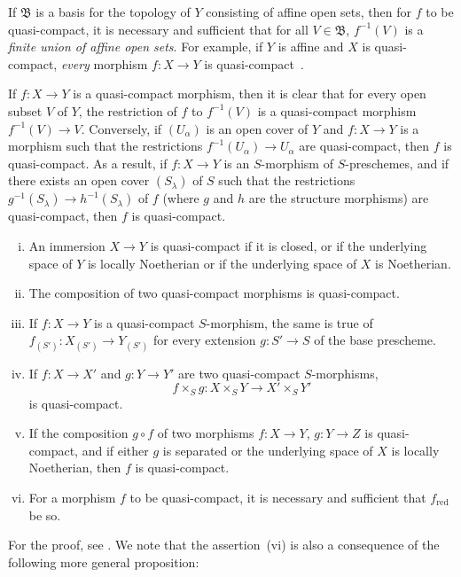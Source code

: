 If $\mathfrak{B}$ is a basis for the topology of $Y$ consisting of affine open sets, then for $f$ to be quasi-compact, it is necessary and sufficient that for all $V\in\mathfrak{B}$, $f^{-1}(V)$ is a \emph{finite union of affine open sets}.
For example, if $Y$ is affine and $X$ is quasi-compact, \emph{every} morphism $f:X\to Y$ is quasi-compact~.

If $f:X\to Y$ is a quasi-compact morphism, then it is clear that for every open subset $V$ of $Y$, the restriction of $f$ to $f^{-1}(V)$ is a quasi-compact morphism $f^{-1}(V)\to V$.
Conversely, if $(U_\alpha)$ is an open cover of $Y$ and $f:X\to Y$ is a morphism such that the restrictions $f^{-1}(U_\alpha)\to U_\alpha$ are quasi-compact, then $f$ is quasi-compact.
As
a result, if $f:X\to Y$ is an $S$-morphism of $S$-preschemes, and if there exists an open cover $(S_\lambda)$ of $S$ such that the restrictions $g^{-1}(S_\lambda)\to h^{-1}(S_\lambda)$ of $f$ (where $g$ and $h$ are the structure morphisms) are quasi-compact, then $f$ is quasi-compact.

\begin{proposition}[1.1.2]
\label{IV.1.1.2}
\medskip\noindent
\begin{enumerate}[(i)]
  \item An immersion $X\to Y$ is quasi-compact if it is closed,
    or if the underlying space of $Y$ is locally Noetherian or if the underlying space of $X$ is Noetherian.
  \item The composition of two quasi-compact morphisms is quasi-compact.
  \item If $f:X\to Y$ is a quasi-compact $S$-morphism, the same is true of $f_{(S')}:X_{(S')}\to Y_{(S')}$
    for every extension $g:S'\to S$ of the base prescheme.
  \item If $f:X\to X'$ and $g:Y\to Y'$ are two quasi-compact $S$-morphisms,
    \[
      f\times_S g: X\times_S Y \to X'\times_S Y'
    \]
    is quasi-compact.
  \item If the composition $g\circ f$ of two morphisms $f:X\to Y$, $g:Y\to Z$ is quasi-compact, and
    if either $g$ is separated or the underlying space of $X$ is locally Noetherian, then $f$ is quasi-compact.
  \item For a morphism $f$ to be quasi-compact, it is necessary and sufficient that $f_{\mathrm{red}}$ be so.
\end{enumerate}
\end{proposition}

For the proof, see .
We note that the assertion~(vi) is also a
consequence of the following more general proposition:

